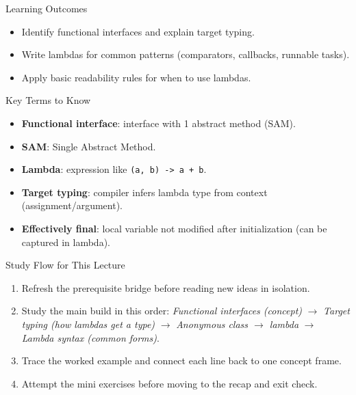\documentclass{beamer}
\begin{document}
\begin{frame}{Learning Outcomes}
  \begin{itemize}[<+->]
    \item Identify functional interfaces and explain target typing.
    \item Write lambdas for common patterns (comparators, callbacks, runnable tasks).
    \item Apply basic readability rules for when to use lambdas.
  \end{itemize}
  \slidesources{\OOPSUnitIVSources}
\end{frame}

\begin{frame}{Key Terms to Know}
\begin{itemize}[<+->]
  \item \textbf{Functional interface}: interface with 1 abstract method (SAM).
  \item \textbf{SAM}: Single Abstract Method.
  \item \textbf{Lambda}: expression like \texttt{(a, b) -> a + b}.
  \item \textbf{Target typing}: compiler infers lambda type from context (assignment/argument).
  \item \textbf{Effectively final}: local variable not modified after initialization (can be captured in lambda).
\end{itemize}
  \slidesources{\OOPSUnitIVSources}
\end{frame}

\begin{frame}{Study Flow for This Lecture}
\begin{enumerate}[<+->]
  \item Refresh the prerequisite bridge before reading new ideas in isolation.
  \item Study the main build in this order: \textit{Functional interfaces (concept)} $\rightarrow$ \textit{Target typing (how lambdas get a type)} $\rightarrow$ \textit{\texorpdfstring{Anonymous class $\rightarrow$ lambda}{Anonymous class -> lambda}} $\rightarrow$ \textit{Lambda syntax (common forms)}.
  \item Trace the worked example and connect each line back to one concept frame.
  \item Attempt the mini exercises before moving to the recap and exit check.
\end{enumerate}
  \slidesources{\OOPSUnitIVSources}
\end{frame}
\end{document}

